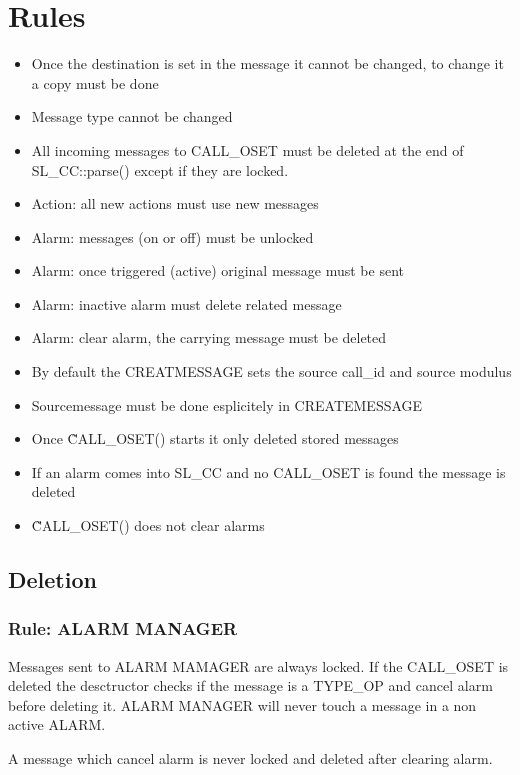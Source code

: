 \documentclass[a4paper]{report}
\begin{document}
\section{Rules}

\begin{itemize}
  \item Once the destination is set in the message it cannot be changed, to
  change it a copy must be done
  \item Message type cannot be changed
  \item All incoming messages to CALL\_OSET must be deleted at the end of
  SL\_CC::parse() except if they are locked.
  \item Action: all new actions must use new messages
  \item Alarm: messages (on or off) must be unlocked
  \item Alarm: once triggered (active) original message must be sent
  \item Alarm: inactive alarm must delete related message
  \item Alarm: clear alarm, the carrying message must be deleted
  \item By default the CREATMESSAGE sets the source call\_id and source modulus
  \item Sourcemessage must be done esplicitely in CREATEMESSAGE
  \item Once \~CALL\_OSET() starts it only deleted stored messages
  \item If an alarm comes into SL\_CC and no CALL\_OSET is found the message is
  deleted
  \item \~CALL\_OSET() does not clear alarms
\end{itemize}


\subsection{Deletion}

\subsubsection{Rule: ALARM MANAGER}
 Messages sent to ALARM MAMAGER are always locked. If the CALL\_OSET is deleted the desctructor checks if the message is a TYPE\_OP and cancel alarm before deleting it.
 ALARM MANAGER will never touch a message in a non active ALARM.
 
 A message which cancel alarm is never locked and deleted after clearing alarm.
 
\end{document}
